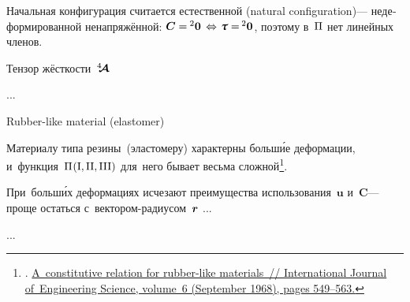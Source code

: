 \begin{otherlanguage}{russian}

\noindent
Начальная конфигурация считается естественной (natural configuration)\:--- недеформированной ненапряжённой: ${\bm{C} = \hspace{-0.1ex} {^2\bm{0}} \hspace{.4ex} \Leftrightarrow \hspace{.2ex} \cauchystress = \hspace{-0.2ex} {^2\bm{0}}}$, поэтому в~$\Pi$ нет линейных членов.

Тензор жёсткости~$\hspace{.08ex}{^4\hspace{-0.7ex}\bm{\mathcal{A}}}\hspace{.08ex}$

...

Rubber\hbox{-}like material (elastomer)

Материалу типа резины~(эластомеру) характерны больш\'{и}е деформации, и~функция~${\Pi\hspace{.12ex}(\mathrm{I}, \mathrm{II}, \mathrm{III})}$ для~него бывает весьма сложной\footnote{. \href{https://kundoc.com/pdf-a-constitutive-relation-for-rubber-like-materials-.html}{A~constitutive relation for rubber-like ma\-te\-ri\-als~// International Journal of~Engineering Science, volume~6 (September 1968), pages 549\hbox{--}563.}}\hbox{\hspace{-0.5ex}.}

При~больш\'{и}х деформациях исчезают преимущества использования~$\bm{u}$ и~$\bm{C}$\:--- проще остаться с~вектором\hbox{-}радиусом~$\bm{r}$ ...

...


\end{otherlanguage}

\newpage



\label{para:piolakirchhoffstresstensor}

